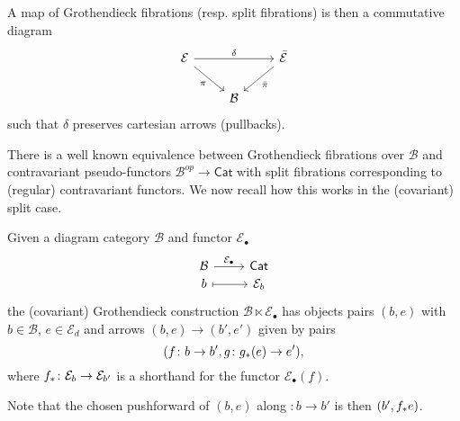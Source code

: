 \documentclass[a4paper,10pt]{article}%
\begin{document}
A map of Grothendieck fibrations (resp. split fibrations) is then a commutative diagram
\begin{equation}
\begin{tikzcd}\label{GROTHFIBMAP EQ}
	\mathcal{E} \ar{rr}{\delta} \ar{rd}[swap]{\pi} &&
	\bar{\mathcal{E}} \ar{dl}{\bar{\pi}}
\\
	& \mathcal{B}
\end{tikzcd}
\end{equation}
such that $\delta$ preserves cartesian arrows (pullbacks).


There is a well known equivalence between Grothendieck fibrations over $\mathcal{B}$ and contravariant pseudo-functors
$\mathcal{B}^{op} \to \mathsf{Cat}$
with split fibrations corresponding to (regular) contravariant functors. We now recall how this works in the (covariant) split case.

\begin{definition}\label{GROTHCONS DEF}
Given a diagram category $\mathcal{B}$ and functor $\mathcal{E}_{\bullet}$
\begin{equation}
\begin{tikzcd}[row sep = 0em]
	\mathcal{B} \ar{r}{\mathcal{E}_{\bullet}} & \mathsf{Cat} \\
	b \ar[mapsto]{r} & \mathcal{E}_b
\end{tikzcd}
\end{equation}
the (covariant) Grothendieck construction 
$\mathcal{B} \ltimes \mathcal{E}_{\bullet}$
has objects pairs $(b,e)$ with $b \in \mathcal{B}$,
$e \in \mathcal{E}_d$ and 
arrows $(b,e) \to (b',e')$ given by pairs
\[(f\colon b \to b', g \colon g_{\**}(e) \to e'),\]
where $f_{\**}\colon \mathcal{E}_b \to \mathcal{E}_{b'}$ is a shorthand for the functor $\mathcal{E}_{\bullet}(f)$.

Note that the chosen pushforward of $(b,e)$ along 
$\colon b \to b'$ is then $(b',f_{\**} e)$.
\end{definition}
\end{document}

